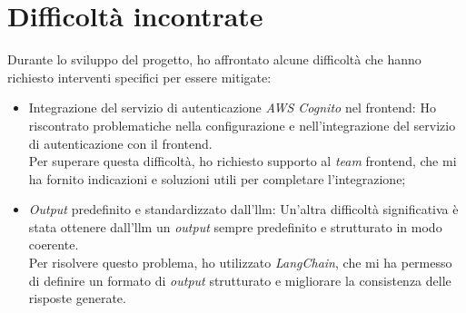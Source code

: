 \section{Difficoltà incontrate}
\label{sez:difficoltà-incontrate}

Durante lo sviluppo del progetto, ho affrontato alcune difficoltà che hanno richiesto interventi specifici per essere mitigate:

\begin{itemize}
\item Integrazione del servizio di autenticazione \textit{AWS Cognito} nel \gls{frontend}: Ho riscontrato problematiche nella configurazione e nell'integrazione del servizio di autenticazione  con il \gls{frontend}.\\
Per superare questa difficoltà, ho richiesto supporto al \textit{team} \gls{frontend}, che mi ha fornito indicazioni e soluzioni utili per completare l'integrazione;

\item \textit{Output} predefinito e standardizzato dall'\gls{llm}: Un'altra difficoltà significativa è stata ottenere dall'\gls{llm} un \textit{output} sempre predefinito e strutturato in modo coerente.  \\    
Per risolvere questo problema, ho utilizzato \textit{LangChain}, che mi ha permesso di definire un formato di \textit{output} strutturato e migliorare la consistenza delle risposte generate.
\end{itemize}